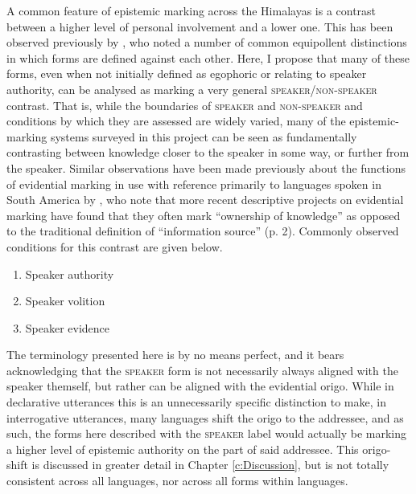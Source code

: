 A common feature of epistemic marking across the Himalayas is a contrast between a higher level of personal involvement and a lower one. This has been observed previously by \cite{Zemp2021a}, who noted a number of common equipollent distinctions in which forms are defined against each other. Here, I propose that many of these forms, even when not initially defined as egophoric or relating to speaker authority, can be analysed as marking a very general \textsc{speaker}/\textsc{non-speaker} contrast. That is, while the boundaries of \textsc{speaker} and \textsc{non-speaker} and conditions by which they are assessed are widely varied, many of the epistemic-marking systems surveyed in this project can be seen as fundamentally contrasting between knowledge closer to the speaker in some way, or further from the speaker. Similar observations have been made previously about the functions of evidential marking in use with reference primarily to languages spoken in South America by , who note that more recent descriptive projects on evidential marking have found that they often mark ``ownership of knowledge'' as opposed to the traditional definition of ``information source'' (p. 2). Commonly observed conditions for this contrast are given below. 

\begin{enumerate}
        \item Speaker authority
        \item Speaker volition
        \item Speaker evidence
\end{enumerate} 

The terminology presented here is by no means perfect, and it bears acknowledging that the \textsc{speaker} form is not necessarily always aligned with the speaker themself, but rather can be aligned with the evidential origo. While in declarative utterances this is an unnecessarily specific distinction to make, in interrogative utterances, many languages shift the origo to the addressee, and as such, the forms here described with the \textsc{speaker} label would actually be marking a higher level of epistemic authority on the part of said addressee. This origo-shift is discussed in greater detail in Chapter \ref{c:Discussion}, but is not totally consistent across all languages, nor across all forms within languages. 

